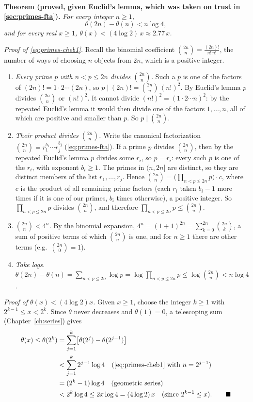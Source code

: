 \textbf{Theorem (proved, given Euclid's lemma, which was taken on trust in \cref{sec:primes-fta}).} \emph{For every integer $n\ge1$,}
\begin{equation}
\theta(2n)-\theta(n) < n\log4,
\label{eq:primes-cheb1}
\end{equation}
\emph{and for every real $x\ge1$, $\theta(x)<(4\log2)\,x\approx2.77\,x$.}

\emph{Proof of \cref{eq:primes-cheb1}.} Recall the binomial coefficient $\binom{2n}{n}=\frac{(2n)!}{n!\,n!}$, the number of ways of choosing $n$ objects from $2n$, which is a positive integer.
\begin{enumerate}
\item \emph{Every prime $p$ with $n<p\le2n$ divides $\binom{2n}{n}$.} Such a $p$ is one of the factors of $(2n)!=1\cdot2\cdots(2n)$, so $p\mid(2n)!=\binom{2n}{n}\,(n!)^2$. By Euclid's lemma $p$ divides $\binom{2n}{n}$ or $(n!)^2$. It cannot divide $(n!)^2=(1\cdot2\cdots n)^2$: by the repeated Euclid's lemma it would then divide one of the factors $1,\dots,n$, all of which are positive and smaller than $p$. So $p\mid\binom{2n}{n}$.
\item \emph{Their product divides $\binom{2n}{n}$.} Write the canonical factorization $\binom{2n}{n}=r_1^{b_1}\cdots r_j^{b_j}$ (\cref{eq:primes-fta}). If a prime $p$ divides $\binom{2n}{n}$, then by the repeated Euclid's lemma $p$ divides some $r_i$, so $p=r_i$: every such $p$ is one of the $r_i$, with exponent $b_i\ge1$. The primes in $(n,2n]$ are distinct, so they are distinct members of the list $r_1,\dots,r_j$. Hence $\binom{2n}{n}=\bigl(\prod_{n<p\le2n}p\bigr)\cdot c$, where $c$ is the product of all remaining prime factors (each $r_i$ taken $b_i-1$ more times if it is one of our primes, $b_i$ times otherwise), a positive integer. So $\prod_{n<p\le2n}p$ divides $\binom{2n}{n}$, and therefore $\prod_{n<p\le2n}p\le\binom{2n}{n}$.
\item \emph{$\binom{2n}{n}<4^n$.} By the binomial expansion, $4^n=(1+1)^{2n}=\sum_{k=0}^{2n}\binom{2n}{k}$, a sum of positive terms of which $\binom{2n}{n}$ is one, and for $n\ge1$ there are other terms (e.g.\ $\binom{2n}{0}=1$).
\item \emph{Take logs.} $\theta(2n)-\theta(n)=\sum_{n<p\le2n}\log p=\log\prod_{n<p\le2n}p\le\log\binom{2n}{n}<n\log4$.
\end{enumerate}

\emph{Proof of $\theta(x)<(4\log2)x$.} Given $x\ge1$, choose the integer $k\ge1$ with $2^{k-1}\le x<2^k$. Since $\theta$ never decreases and $\theta(1)=0$, a telescoping sum (Chapter~\ref{ch:series}) gives
\begin{align*}
\theta(x)\le\theta(2^k) &= \sum_{j=1}^{k}\bigl[\theta(2^j)-\theta(2^{j-1})\bigr] \\
&< \sum_{j=1}^{k}2^{j-1}\log4 \quad\text{(\cref{eq:primes-cheb1} with $n=2^{j-1}$)}\\
&= (2^k-1)\log4 \quad\text{(geometric series)}\\
&< 2^k\log4 \le 2x\log4=(4\log2)\,x \quad\text{(since $2^{k-1}\le x$)}. \qquad\blacksquare
\end{align*}

